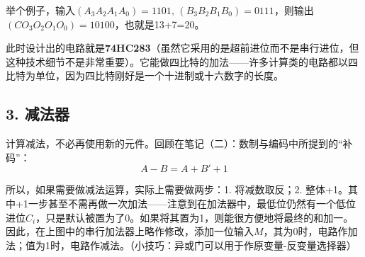 \documentclass[UTF8]{ctexart}
\begin{document}
举个例子，输入$(A_3A_2A_1A_0)=1101,\,(B_3B_2B_1B_0)=0111$，则输出$(CO_3O_2O_1O_0)=10100$，也就是13+7=20。

此时设计出的电路就是\textbf{74HC283}（虽然它采用的是超前进位而不是串行进位，但这种技术细节不是非常重要）。它能做四比特的加法——许多计算类的电路都以四比特为单位，因为四比特刚好是一个十进制或十六数字的长度。

\subsection*{3. 减法器}
计算减法，不必再使用新的元件。回顾在笔记（二）：数制与编码中所提到的“补码”：
\[A-B=A+B'+1\]

所以，如果需要做减法运算，实际上需要做两步：1. 将减数取反；2. 整体+1。其中+1一步甚至不需再做一次加法——注意到在加法器中，最低位仍然有一个低位进位$C_i$，只是默认被置为了0。如果将其置为1，则能很方便地将最终的和加一。因此，在上图中的串行加法器上略作修改，添加一位输入$M$，其为0时，电路作加法；值为1时，电路作减法。（小技巧：异或门可以用于作原变量-反变量选择器）
\end{document}

